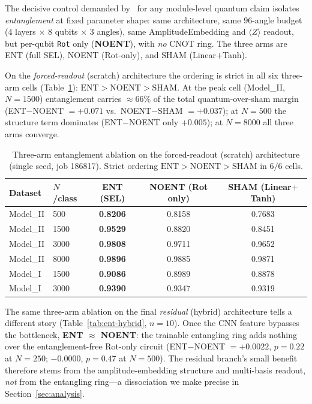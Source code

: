\documentclass[10pt,letterpaper]{article}
\theoremstyle{plain}
\theoremstyle{definition}
\newcommand{\win}[1]{\textcolor{good}{\textbf{#1}}}
\begin{document}
The decisive control demanded by~\cite{bowles2024,schnabel2025} for any
module-level quantum claim isolates \emph{entanglement} at fixed parameter shape:
same architecture, same $96$-angle budget ($4$ layers $\times$ $8$ qubits
$\times$ $3$ angles), same AmplitudeEmbedding and $\langle Z\rangle$ readout, but
per-qubit \texttt{Rot} only (\textbf{NOENT}), with \emph{no} CNOT ring. The three
arms are ENT (full SEL), NOENT (Rot-only), and SHAM (Linear$+$Tanh).

On the \emph{forced-readout} (scratch) architecture the ordering is strict in all
six three-arm cells (Table~\ref{tab:ent-scratch}): $\mathrm{ENT} > \mathrm{NOENT}
> \mathrm{SHAM}$. At the peak cell (Model\_II, $N{=}1500$) entanglement carries
$\approx 66\%$ of the total quantum-over-sham margin (ENT$-$NOENT $=+0.071$ vs.\
NOENT$-$SHAM $=+0.037$); at $N{=}500$ the structure term dominates
(ENT$-$NOENT only $+0.005$); at $N{=}8000$ all three arms converge.

\begin{table}[h!]
\centering
\caption{Three-arm entanglement ablation on the forced-readout (scratch)
architecture (single seed, job 186817). Strict ordering
$\mathrm{ENT} > \mathrm{NOENT} > \mathrm{SHAM}$ in $6/6$ cells.}
\label{tab:ent-scratch}
\begin{tabular}{@{}llccc@{}}
\toprule
Dataset & $N$/class & ENT (SEL) & NOENT (Rot only) & SHAM (Linear$+$Tanh) \\
\midrule
Model\_II & 500  & \win{0.8206} & 0.8158 & 0.7683 \\
Model\_II & 1500 & \win{0.9529} & 0.8820 & 0.8451 \\
Model\_II & 3000 & \win{0.9808} & 0.9711 & 0.9652 \\
Model\_II & 8000 & \win{0.9896} & 0.9885 & 0.9871 \\
Model\_I  & 1500 & \win{0.9086} & 0.8989 & 0.8878 \\
Model\_I  & 3000 & \win{0.9390} & 0.9347 & 0.9319 \\
\bottomrule
\end{tabular}
\end{table}

The same three-arm ablation on the final \emph{residual} (hybrid) architecture
tells a different story (Table~\ref{tab:ent-hybrid}, $n{=}10$). Once the CNN
feature bypasses the bottleneck, \textbf{ENT $\approx$ NOENT}: the trainable
entangling ring adds nothing over the entanglement-free Rot-only circuit
(ENT$-$NOENT $=+0.0022$, $p{=}0.22$ at $N{=}250$; $-0.0000$, $p{=}0.47$ at
$N{=}500$). The residual branch's small benefit therefore stems from the
amplitude-embedding structure and multi-basis readout, \emph{not} from the
entangling ring---a dissociation we make precise in Section~\ref{sec:analysis}.
\end{document}
